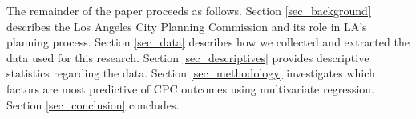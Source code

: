 The remainder of the paper proceeds as follows. 
Section \ref{sec_background} describes the Los Angeles City Planning Commission and its role in LA's planning process. Section \ref{sec_data} describes how we collected and extracted the data used for this research. Section \ref{sec_descriptives} provides descriptive statistics regarding the data. Section \ref{sec_methodology} investigates which factors are most predictive of CPC outcomes using multivariate regression. Section \ref{sec_conclusion} concludes.


